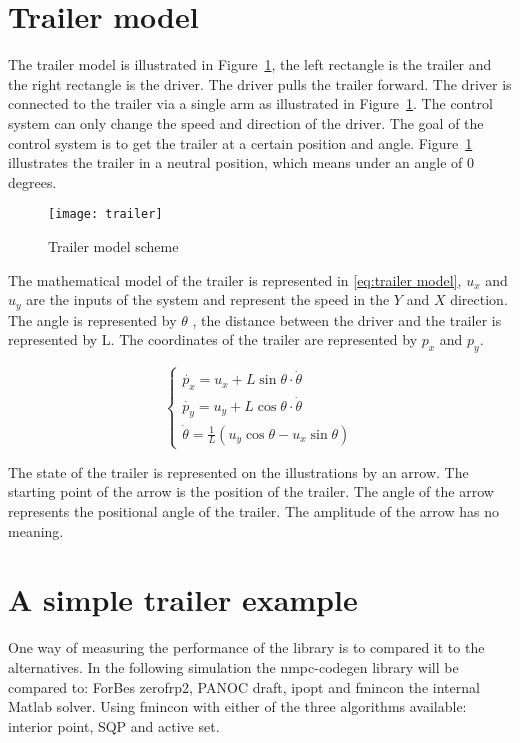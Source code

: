 \section{Trailer model}
The trailer model is illustrated in Figure~\ref{fig:trailer model}, the left rectangle is the trailer and the right rectangle is the driver. The driver pulls the trailer forward. The driver is connected to the trailer via a single arm as illustrated in Figure~\ref{fig:trailer model}. The control system can only change the speed and direction of the driver. The goal of the control system is to get the trailer at a certain position and angle. Figure~\ref{fig:trailer model} illustrates the trailer in a neutral position, which means under an angle of 0 degrees.

\begin{figure}
	\centering
	\texttt{[image: trailer]}
	\caption{Trailer model scheme}
	\label{fig:trailer model}
\end{figure}

The mathematical model of the trailer is represented in \eqref{eq:trailer model}, $u_x$ and $u_y$ are the inputs of the system and represent the speed in the $Y$ and $X$ direction. The angle is represented by $\theta$ , the distance between the driver and the trailer is represented by L. The coordinates of the trailer are represented by $p_x$ and $p_y$.

\begin{equation}
	\begin{cases}
		\dot{p_x} = u_x + L \sin \theta \cdot \dot{\theta} \\
		\dot{p_y} = u_y + L \cos \theta \cdot \dot{\theta} \\
		\dot{\theta} = \frac{1}{L}(u_y\cos \theta - u_x \sin \theta)	
	\end{cases}
	\label{eq:trailer model}
\end{equation}

The state of the trailer is represented on the illustrations by an arrow. The starting point of the arrow is the position of the trailer. The angle of the arrow represents the positional angle of the trailer. The amplitude of the arrow has no meaning.

\section{A simple trailer example}
One way of measuring the performance of the library is to compared it to the alternatives. In the following simulation the nmpc-codegen library will be compared to: ForBes zerofrp2, PANOC draft, ipopt and fmincon the internal Matlab solver. Using fmincon with either of the three algorithms available: interior point, SQP and active set.

